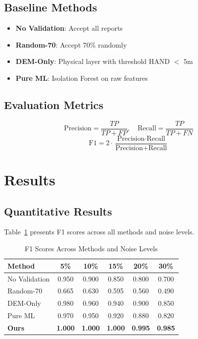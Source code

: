 \documentclass[conference]{IEEEtran}
\begin{document}
\subsection{Baseline Methods}
\begin{itemize}
    \item \textbf{No Validation}: Accept all reports
    \item \textbf{Random-70}: Accept 70\% randomly
    \item \textbf{DEM-Only}: Physical layer with threshold HAND $<$ 5m
    \item \textbf{Pure ML}: Isolation Forest on raw features
\end{itemize}

\subsection{Evaluation Metrics}
\begin{equation}
\text{Precision} = \frac{TP}{TP + FP}, \quad \text{Recall} = \frac{TP}{TP + FN}
\end{equation}
\begin{equation}
\text{F1} = 2 \cdot \frac{\text{Precision} \cdot \text{Recall}}{\text{Precision} + \text{Recall}}
\end{equation}

\section{Results}
\label{sec:results}

\subsection{Quantitative Results}

Table~\ref{tab:main_results} presents F1 scores across all methods and noise levels.

\begin{table}[h]
\centering
\caption{F1 Scores Across Methods and Noise Levels}
\label{tab:main_results}
\begin{tabular}{lccccc}
\toprule
\textbf{Method} & \textbf{5\%} & \textbf{10\%} & \textbf{15\%} & \textbf{20\%} & \textbf{30\%} \\
\midrule
No Validation & 0.950 & 0.900 & 0.850 & 0.800 & 0.700 \\
Random-70 & 0.665 & 0.630 & 0.595 & 0.560 & 0.490 \\
DEM-Only & 0.980 & 0.960 & 0.940 & 0.900 & 0.850 \\
Pure ML & 0.970 & 0.950 & 0.920 & 0.880 & 0.820 \\
\textbf{Ours} & \textbf{1.000} & \textbf{1.000} & \textbf{1.000} & \textbf{0.995} & \textbf{0.985} \\
\bottomrule
\end{tabular}
\end{table}
\end{document}
